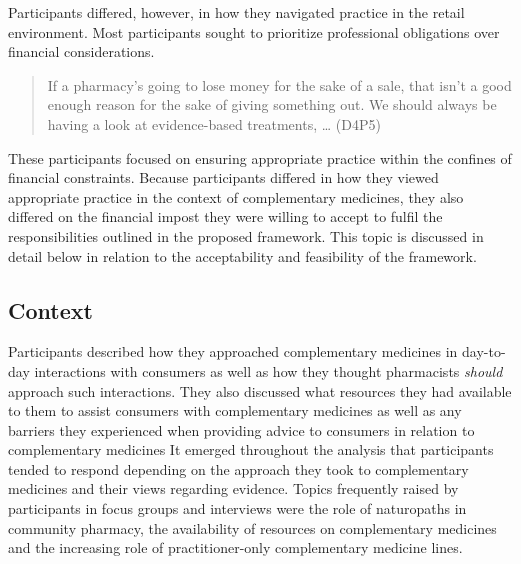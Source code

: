 \documentclass[11pt,a4paper]{article}
\begin{document}
Participants differed, however, in how they navigated practice in the
retail environment. Most participants sought to prioritize professional
obligations over financial considerations.

\begin{quote}
If a pharmacy's going to lose money for the sake of a sale, that isn't a
good enough reason for the sake of giving something out. We should
always be having a look at evidence-based treatments, \ldots{} (D4P5)
\end{quote}

These participants focused on ensuring appropriate practice within the
confines of financial constraints. Because participants differed in how
they viewed appropriate practice in the context of complementary
medicines, they also differed on the financial impost they were willing
to accept to fulfil the responsibilities outlined in the proposed
framework. This topic is discussed in detail below in relation to the
acceptability and feasibility of the framework.

\subsection{Context}\label{context}

Participants described how they approached complementary medicines in
day-to-day interactions with consumers as well as how they thought
pharmacists \emph{should} approach such interactions. They also
discussed what resources they had available to them to assist consumers
with complementary medicines as well as any barriers they experienced
when providing advice to consumers in relation to complementary
medicines It emerged throughout the analysis that participants tended to
respond depending on the approach they took to complementary medicines
and their views regarding evidence. Topics frequently raised by
participants in focus groups and interviews were the role of naturopaths
in community pharmacy, the availability of resources on complementary
medicines and the increasing role of practitioner-only complementary
medicine lines.
\end{document}
